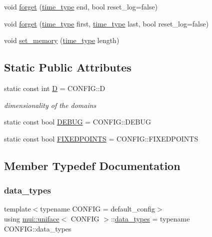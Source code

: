 \begin{DoxyCompactItemize}
\item 
void \hyperlink{classmui_1_1uniface_ad961705e00b7e217556e9e26bef28f75}{forget} (\hyperlink{classmui_1_1uniface_a65cbecf1936d7d61cb45f14b1138dc07}{time\+\_\+type} end, bool reset\+\_\+log=false)
\item 
void \hyperlink{classmui_1_1uniface_a0b502166a7dd9ca84912d8ad08237453}{forget} (\hyperlink{classmui_1_1uniface_a65cbecf1936d7d61cb45f14b1138dc07}{time\+\_\+type} first, \hyperlink{classmui_1_1uniface_a65cbecf1936d7d61cb45f14b1138dc07}{time\+\_\+type} last, bool reset\+\_\+log=false)
\item 
void \hyperlink{classmui_1_1uniface_adf78a7f854d37527fccca00a8a4d02aa}{set\+\_\+memory} (\hyperlink{classmui_1_1uniface_a65cbecf1936d7d61cb45f14b1138dc07}{time\+\_\+type} length)
\end{DoxyCompactItemize}
\subsection*{Static Public Attributes}
\begin{DoxyCompactItemize}
\item 
static const int \hyperlink{classmui_1_1uniface_ad07ef49eaa55f7db5da324edff430032}{D} = C\+O\+N\+F\+I\+G\+::D
\begin{DoxyCompactList}\small\item\em dimensionality of the domains \end{DoxyCompactList}\item 
static const bool \hyperlink{classmui_1_1uniface_a45811234a0e40931f9fcf2a966795c3e}{D\+E\+B\+UG} = C\+O\+N\+F\+I\+G\+::\+D\+E\+B\+UG
\item 
static const bool \hyperlink{classmui_1_1uniface_a19b11cf2c84dbb5c8c08849263068913}{F\+I\+X\+E\+D\+P\+O\+I\+N\+TS} = C\+O\+N\+F\+I\+G\+::\+F\+I\+X\+E\+D\+P\+O\+I\+N\+TS
\end{DoxyCompactItemize}


\subsection{Member Typedef Documentation}
\mbox{\label{classmui_1_1uniface_a9528cdfb58805e97fd58dd991d850360}} 
\subsubsection{\texorpdfstring{data\+\_\+types}{data\_types}}
{\footnotesize\ttfamily template$<$typename C\+O\+N\+F\+IG  = default\+\_\+config$>$ \\
using \hyperlink{classmui_1_1uniface}{mui\+::uniface}$<$ C\+O\+N\+F\+IG $>$\+::\hyperlink{classmui_1_1uniface_a9528cdfb58805e97fd58dd991d850360}{data\+\_\+types} =  typename C\+O\+N\+F\+I\+G\+::data\+\_\+types}

